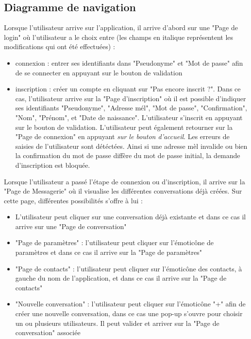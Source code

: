 	\newpage

	\subsection{Diagramme de navigation}
	Lorsque l'utilisateur arrive sur l'application, il arrive d'abord sur une "Page de login" où l'utilisateur a le choix entre (les champs en italique représentent les modifications qui ont été effectuées) :
	\begin{itemize}
		\item connexion : entrer ses identifiants dans "Pseudonyme" et "Mot de passe" afin de se connecter en appuyant sur le bouton de validation
		\item inscription : créer un compte en cliquant sur "Pas encore inscrit ?".
		Dans ce cas, l'utilisateur arrive sur la "Page d'inscription" où il est possible d'indiquer ses identifiants "Pseudonyme", "Adresse mél", "Mot de passe", "Confirmation", "Nom", "Prénom", et "Date de naissance".
		L'utilisateur s'inscrit en appuyant sur le bouton de validation.
		L'utilisateur peut également retourner sur la "Page de connexion" en appuyant \textit{sur le bouton d'accueil}.
		Les erreurs de saisies de l'utilisateur sont détéctées. Ainsi si une adresse mèl invalide ou bien la confirmation du mot de passe diffère du mot de passe initial, la demande d'inscription est bloquée.\\
	\end{itemize}

	Lorsque l'utilisateur a passé l'étape de connexion ou d'inscription, il arrive sur la "Page de Messagerie" où il visualise les différentes conversations déjà créées. Sur cette page, différentes possibilités s'offre à lui :
	\begin{itemize}
		\item L'utilisateur peut cliquer sur une conversation déjà existante et dans ce cas il arrive sur une "Page de conversation"
		\item "Page de paramètres" : l'utilisateur peut cliquer sur l’émoticône de paramètres et dans ce cas il arrive sur la "Page de paramètres"
		\item "Page de contacts" : l'utilisateur peut cliquer sur l’émoticône des contacts, à gauche du nom de l'application, et dans ce cas il arrive sur la "Page de contacts"
		\item "Nouvelle conversation" : l'utilisateur peut cliquer sur l’émoticône "+" afin de créer une nouvelle conversation, dans ce cas une pop-up s'ouvre pour choisir un ou plusieurs utilisateurs. Il peut valider et arriver sur la "Page de conversation" associée\\
	\end{itemize}

